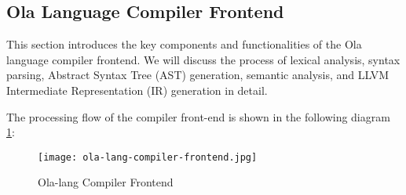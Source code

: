 \subsection{Ola Language Compiler Frontend}

This section introduces the key components and functionalities of the Ola language compiler frontend. We will discuss the process of lexical analysis, syntax parsing, Abstract Syntax Tree (AST) generation, semantic analysis, and LLVM Intermediate Representation (IR) generation in detail.

The processing flow of the compiler front-end is shown in the following diagram \ref{fig:ola-lang-compiler-frontend}:

\begin{figure}[!ht]
    \centering
    \texttt{[image: ola-lang-compiler-frontend.jpg]}
    \caption{Ola-lang Compiler Frontend}
    \label{fig:ola-lang-compiler-frontend}
\end{figure}





